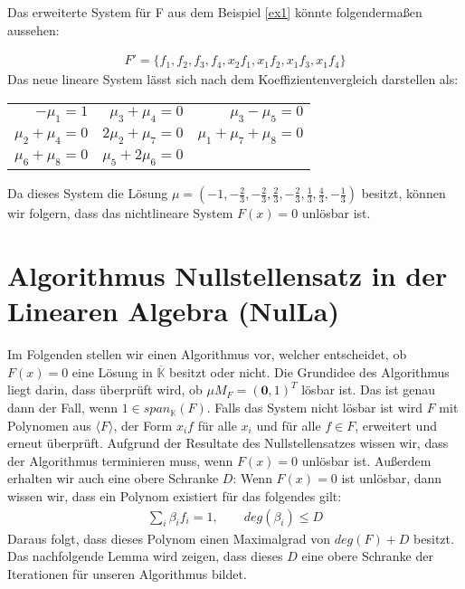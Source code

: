 \begin{example}
Das erweiterte System für F aus dem Beispiel \ref{ex1} könnte folgendermaßen aussehen:

\begin{align*}
F'=\{f_1,f_2,f_3,f_4,x_2f_1,x_1f_2,x_1f_3,x_1f_4\}
\end{align*}
Das neue lineare System lässt sich nach dem Koeffizientenvergleich darstellen als:


\begin{table}[h]%
\begin{center}
\begin{tabular}{rrr}
$-\mu_1=1$ & $\mu_3+\mu_4=0$ & $\mu_3-\mu_5=0$ \\
$\mu_2+\mu_4=0$ & $2\mu_2+\mu_7=0$ & $\mu_1+\mu_7+\mu_8=0$ \\
$\mu_6 + \mu_8 = 0$ & $\mu_5+2\mu_6 = 0$
\end{tabular}
\label{}
\end{center}
\end{table}

\noindent Da dieses System die Lösung $\mu = (-1,-\frac{2}{3},-\frac{2}{3},\frac{2}{3},-\frac{2}{3},\frac{1}{3},\frac{4}{3},-\frac{1}{3})$ besitzt, können wir folgern, dass das nichtlineare System $F(x) = 0$ unlösbar ist. \cite{Ausgangsartikel}
\end{example}

\section{Algorithmus Nullstellensatz in der Linearen Algebra (NulLa)}

Im Folgenden stellen wir einen Algorithmus vor, welcher entscheidet, ob $F(x) = 0$ eine Lösung in $\overline{\mathbb{K}}$ besitzt oder nicht. Die Grundidee des Algorithmus liegt darin, dass überprüft wird, ob $\mu M_F = (\textbf{0},1)^T$ lösbar ist. Das ist genau dann der Fall, wenn $1 \in span_\mathbb{K}(F)$. Falls das System nicht lösbar ist wird $F$ mit Polynomen aus $\langle F \rangle$, der Form $x_if$ für alle $x_i$ und für alle $f \in F$, erweitert und erneut überprüft. Aufgrund der Resultate des Nullstellensatzes wissen wir, dass der Algorithmus terminieren muss, wenn $F(x) = 0$ unlösbar ist. Außerdem erhalten wir auch eine obere Schranke $D$: Wenn $F(x) = 0$ ist unlösbar, dann wissen wir, dass ein Polynom existiert für das folgendes gilt: 
\begin{align*}
\sum_i \beta_i f_i = 1, \qquad deg(\beta_i)\le D
\end{align*}
Daraus folgt, dass dieses Polynom einen Maximalgrad von $deg(F)+D$ besitzt. \\
Das nachfolgende Lemma wird zeigen, dass dieses $D$ eine obere Schranke der Iterationen für unseren Algorithmus bildet.

